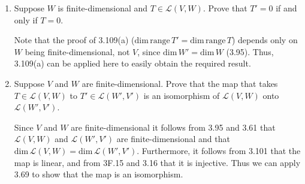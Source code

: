 \documentclass{book}
\begin{document}
\begin{enumerate}
(a) Suppose \(\phi \in \mathcal{P}(\textbf{R})'\) is defined by \(\phi(p)=p'(4)\).  Describe the linear functional \(T'(\phi)\) on \(\mathcal{P}(\textbf{R})\).

(b) Suppose \(\phi \in \mathcal{P}(\textbf{R})'\) is defined by \(\phi(p)=\int_{0}^{1} p(x) dx\).  Evaluate \((T'(\phi))(x^3)\).

(a) The functional \(T'(\phi)\) is described by

\begin{equation*}
    \begin{split}
        ((T'\phi) p(x)) &= (\phi(Tp(x))) \\
        &= \phi(x^2 p(x)+p''(x)) \\
        &= 8p(4)+16p'(4)+p'''(4).
    \end{split}
\end{equation*}

(b) The evaluation is straightforward:

\begin{equation*}
    \begin{split}
        (T'(\phi))(x^3) &= T'(\phi(x^3)) \\
        &= T'(x^5+6x) \\
        &= \int_0^1 (x^5+6x)dx \\
        &= \frac{19}{3}.
    \end{split}
\end{equation*}

\item Suppose \(W\) is finite-dimensional and \(T \in \mathcal{L}(V,W)\).  Prove that \(T'=0\) if and only if \(T=0\).

Note that the proof of 3.109(a) (\(\text{dim} \, \text{range} \, T'=\text{dim} \, \text{range} \, T\)) depends only on \(W\) being finite-dimensional, not \(V\), since \(\text{dim} \, W'=\text{dim} \, W\) (3.95).  Thus, 3.109(a) can be applied here to easily obtain the required result.

\item Suppose \(V\) and \(W\) are finite-dimensional.  Prove that the map that takes \(T \in \mathcal{L}(V,W)\) to \(T' \in \mathcal{L}(W',V')\) is an isomorphism of \(\mathcal{L}(V,W)\) onto \(\mathcal{L}(W',V')\).

Since \(V\) and \(W\) are finite-dimensional it follows from 3.95 and 3.61 that \(\mathcal{L}(V,W)\) and \(\mathcal{L}(W',V')\) are finite-dimensional and that \(\text{dim} \, \mathcal{L}(V,W)=\text{dim} \, \mathcal{L}(W',V')\).  Furthermore, it follows from 3.101 that the map is linear, and from 3F.15 and 3.16 that it is injective.  Thus we can apply 3.69 to show that the map is an isomorphism.


\end{enumerate}
\end{document}
